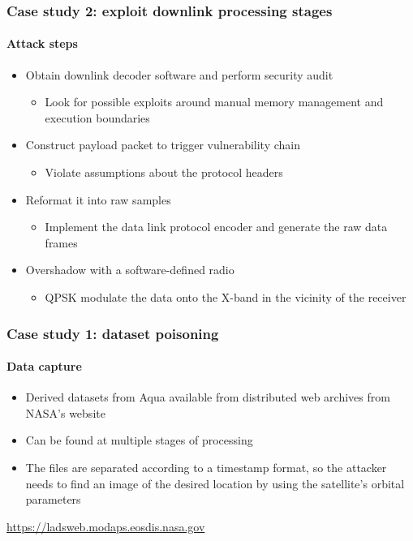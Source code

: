 \documentclass{beamer}
\begin{document}
\begin{frame}
  \frametitle{Case study 2: exploit downlink processing stages}
  \framesubtitle{Attack steps}
  \begin{itemize}[<+->]
   \item Obtain downlink decoder software and perform security audit
   \begin{itemize}
     \item Look for possible exploits around manual memory management and execution boundaries
   \end{itemize}

    \item Construct payload packet to trigger vulnerability chain
    \begin{itemize}
      \item Violate assumptions about the protocol headers
    \end{itemize}

    \item Reformat it into raw samples
    \begin{itemize}
      \item Implement the data link protocol encoder and generate the raw data frames
    \end{itemize}

    \item Overshadow with a software-defined radio
    \begin{itemize}
      \item QPSK modulate the data onto the X-band in the vicinity of the receiver
    \end{itemize}
  \end{itemize}
\end{frame}


\begin{frame}
  \frametitle{Case study 1: dataset poisoning}
  \framesubtitle{Data capture}
  \begin{itemize}[<+->]
    \item Derived datasets from Aqua available from distributed web archives from NASA's website
    \item Can be found at multiple stages of processing
    \item The files are separated according to a timestamp format, so the attacker needs to find an image of the desired location by using the satellite's orbital parameters
  \end{itemize}
  
  \url{https://ladsweb.modaps.eosdis.nasa.gov}

\end{frame}
\end{document}
